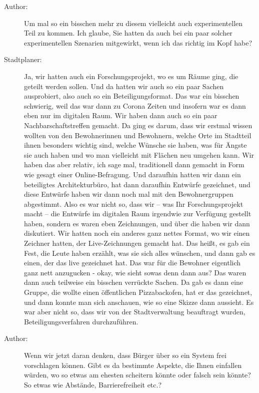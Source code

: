 \begin{description}
\item[Author:] Um mal so ein bisschen mehr zu diesem vielleicht auch experimentellen Teil zu kommen. Ich glaube, Sie hatten da auch bei ein paar solcher experimentellen Szenarien mitgewirkt, wenn ich das richtig im Kopf habe?
\item[Stadtplaner:] Ja, wir hatten auch ein Forschungsprojekt, wo es um Räume ging, die geteilt werden sollen. Und da hatten wir auch so ein paar Sachen ausprobiert, also auch so ein Beteiligungsformat. Das war ein bisschen schwierig, weil das war dann zu Corona Zeiten und insofern war es dann eben nur im digitalen Raum. Wir haben dann auch so ein paar Nachbarschaftstreffen gemacht. Da ging es darum, dass wir erstmal wissen wollten von den Bewohnerinnen und Bewohnern, welche Orte im Stadtteil ihnen besonders wichtig sind, welche Wünsche sie haben, was für Ängste sie auch haben und wo man vielleicht mit Flächen neu umgehen kann. Wir haben das aber relativ, ich sage mal, traditionell dann gemacht in Form wie gesagt einer Online-Befragung. Und daraufhin hatten wir dann ein beteiligtes Architekturbüro, hat dann daraufhin Entwürfe gezeichnet, und diese Entwürfe haben wir dann noch mal mit den Bewohnergruppen abgestimmt. Also es war nicht so, dass wir – was Ihr Forschungsprojekt macht – die Entwürfe im digitalen Raum irgendwie zur Verfügung gestellt haben, sondern es waren eben Zeichnungen, und über die haben wir dann diskutiert. Wir hatten noch ein anderes ganz nettes Format, wo wir einen Zeichner hatten, der Live-Zeichnungen gemacht hat. Das heißt, es gab ein Fest, die Leute haben erzählt, was sie sich alles wünschen, und dann gab es einen, der das live gezeichnet hat. Das war für die Bewohner eigentlich ganz nett anzugucken - okay, wie sieht sowas denn dann aus? Das waren dann auch teilweise ein bisschen verrückte Sachen. Da gab es dann eine Gruppe, die wollte einen öffentlichen Pizzabackofen, hat er das gezeichnet, und dann konnte man sich anschauen, wie so eine Skizze dann aussieht. Es war aber nicht so, dass wir von der Stadtverwaltung beauftragt wurden, Beteiligungsverfahren durchzuführen.
\item[Author:] Wenn wir jetzt daran denken, dass Bürger über so ein System frei vorschlagen können. Gibt es da bestimmte Aspekte, die Ihnen einfallen würden, wo so etwas am ehesten scheitern könnte oder falsch sein könnte? So etwas wie Abstände, Barrierefreiheit etc.?

\end{description}
